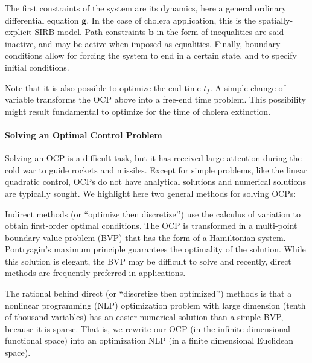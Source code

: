 The first constraints of the system are its dynamics, here a general ordinary differential equation $\textbf{g}$. In the case of cholera application, this is the spatially-explicit SIRB model. Path constraints $\textbf{b}$ in the form of inequalities are said inactive, and may be active when imposed as equalities. Finally, boundary conditions allow for forcing the system to end in a certain state, and to specify initial conditions.

Note that it is also possible to optimize the end time $t_f$. A simple change of variable transforms the OCP above into a free-end time problem. This possibility might result fundamental to optimize for the time of cholera extinction.

\paragraph{Solving an Optimal Control Problem}
Solving an OCP is a difficult task, but it  has received large attention during the cold war to guide rockets and missiles. Except for simple problems, like the linear quadratic  control, OCPs do not have analytical solutions and numerical solutions are typically sought. We highlight here two general methods for solving OCPs:

\par Indirect methods (or ``optimize then discretize’’) use the calculus of variation to obtain first-order optimal conditions. The OCP is transformed in a multi-point boundary value problem (BVP) that has the form of a Hamiltonian system. Pontryagin’s maximum principle guarantees the optimality of the solution. While this solution is elegant, the BVP may be difficult to solve and recently, direct methods are frequently preferred in applications.

\par The rational behind direct (or ``discretize then optimized’’) methods is that a nonlinear programming (NLP) optimization problem with large dimension (tenth of thousand variables) has an easier numerical solution than a simple BVP, because it is sparse. That is, we rewrite our OCP (in the infinite dimensional functional space) into an optimization NLP (in a finite dimensional Euclidean space). 

